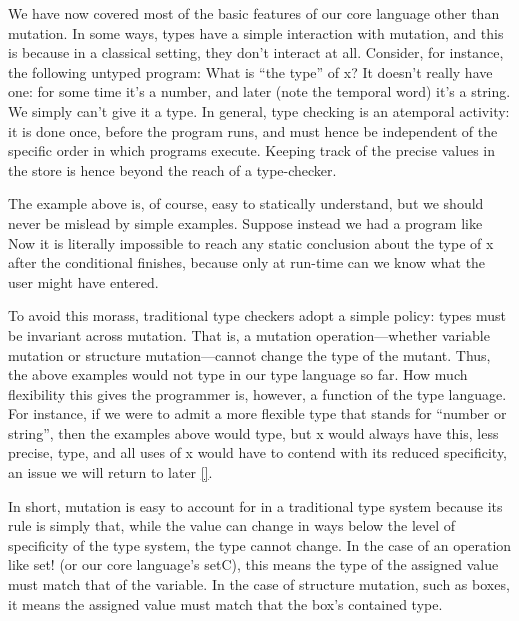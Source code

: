 
We have now covered most of the basic features of our core language other than
mutation. In some ways, types have a simple interaction with mutation, and this
is because in a classical setting, they don’t interact at all. Consider, for
instance, the following untyped program:
What is “the type” of x? It doesn’t really have one: for some time it’s a
number, and later (note the temporal word) it’s a string. We simply can’t give
it a type. In general, type checking is an atemporal activity: it is done once,
before the program runs, and must hence be independent of the specific order in
which programs execute. Keeping track of the precise values in the store is
hence beyond the reach of a type-checker.

The example above is, of course, easy to statically understand, but we should
never be mislead by simple examples. Suppose instead we had a program like
Now it is literally impossible to reach any static conclusion about the type of
x after the conditional finishes, because only at run-time can we know what the
user might have entered.

To avoid this morass, traditional type checkers adopt a simple policy: types
must be invariant across mutation. That is, a mutation operation—whether
variable mutation or structure mutation—cannot change the type of the mutant.
Thus, the above examples would not type in our type language so far. How much
flexibility this gives the programmer is, however, a function of the type
language. For instance, if we were to admit a more flexible type that stands for
“number or string”, then the examples above would type, but x would always have
this, less precise, type, and all uses of x would have to contend with its
reduced specificity, an issue we will return to later \ref{}.

In short, mutation is easy to account for in a traditional type system because
its rule is simply that, while the value can change in ways below the level of
specificity of the type system, the type cannot change. In the case of an
operation like set! (or our core language’s setC), this means the type of the
assigned value must match that of the variable. In the case of structure
mutation, such as boxes, it means the assigned value must match that the box’s
contained type.
